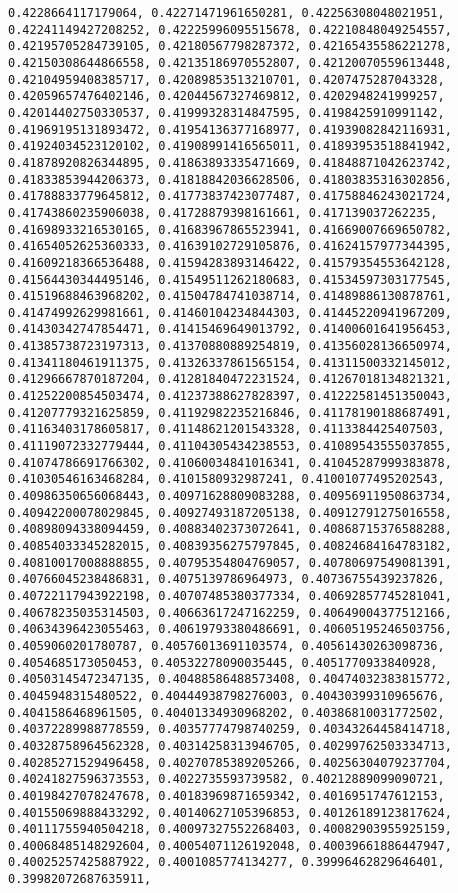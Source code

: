 \documentclass[11pt]{article}
\begin{document}
\begin{Verbatim}[commandchars=\\\{\}]
0.4228664117179064, 0.42271471961650281, 0.42256308048021951, 0.42241149427208252, 0.42225996095515678, 0.42210848049254557, 0.42195705284739105, 0.42180567798287372, 0.42165435586221278, 0.42150308644866558, 0.42135186970552807, 0.42120070559613448, 0.42104959408385717, 0.42089853513210701, 0.4207475287043328, 0.42059657476402146, 0.42044567327469812, 0.4202948241999257, 0.42014402750330537, 0.41999328314847595, 0.4198425910991142, 0.41969195131893472, 0.41954136377168977, 0.41939082842116931, 0.41924034523120102, 0.41908991416565011, 0.41893953518841942, 0.41878920826344895, 0.41863893335471669, 0.41848871042623742, 0.41833853944206373, 0.41818842036628506, 0.41803835316302856, 0.41788833779645812, 0.41773837423077487, 0.41758846243021724, 0.41743860235906038, 0.41728879398161661, 0.417139037262235, 0.41698933216530165, 0.41683967865523941, 0.41669007669650782, 0.41654052625360333, 0.41639102729105876, 0.41624157977344395, 0.41609218366536488, 0.41594283893146422, 0.41579354553642128, 0.41564430344495146, 0.41549511262180683, 0.41534597303177545, 0.41519688463968202, 0.41504784741038714, 0.41489886130878761, 0.41474992629981661, 0.41460104234844303, 0.41445220941967209, 0.41430342747854471, 0.41415469649013792, 0.41400601641956453, 0.41385738723197313, 0.41370880889254819, 0.41356028136650974, 0.41341180461911375, 0.41326337861565154, 0.41311500332145012, 0.41296667870187204, 0.41281840472231524, 0.41267018134821321, 0.41252200854503474, 0.41237388627828397, 0.41222581451350043, 0.41207779321625859, 0.41192982235216846, 0.41178190188687491, 0.41163403178605817, 0.41148621201543328, 0.4113384425407503, 0.41119072332779444, 0.41104305434238553, 0.41089543555037855, 0.41074786691766302, 0.41060034841016341, 0.41045287999383878, 0.41030546163468284, 0.4101580932987241, 0.41001077495202543, 0.40986350656068443, 0.40971628809083288, 0.40956911950863734, 0.40942200078029845, 0.40927493187205138, 0.40912791275016558, 0.40898094338094459, 0.40883402373072641, 0.40868715376588288, 0.40854033345282015, 0.40839356275797845, 0.40824684164783182, 0.40810017008888855, 0.40795354804769057, 0.40780697549081391, 0.40766045238486831, 0.4075139786964973, 0.40736755439237826, 0.40722117943922198, 0.40707485380377334, 0.40692857745281041, 0.40678235035314503, 0.40663617247162259, 0.40649004377512166, 0.40634396423055463, 0.40619793380486691, 0.40605195246503756, 0.4059060201780787, 0.40576013691103574, 0.40561430263098736, 0.4054685173050453, 0.40532278090035445, 0.4051770933840928, 0.40503145472347135, 0.40488586488573408, 0.40474032383815772, 0.4045948315480522, 0.40444938798276003, 0.40430399310965676, 0.4041586468961505, 0.40401334930968202, 0.40386810031772502, 0.40372289988778559, 0.40357774798740259, 0.40343264458414718, 0.40328758964562328, 0.40314258313946705, 0.40299762503334713, 0.40285271529496458, 0.40270785389205266, 0.40256304079237704, 0.40241827596373553, 0.4022735593739582, 0.40212889099090721, 0.40198427078247678, 0.40183969871659342, 0.4016951747612153, 0.40155069888433292, 0.40140627105396853, 0.40126189123817624, 0.40111755940504218, 0.40097327552268403, 0.40082903955925159, 0.40068485148292604, 0.40054071126192048, 0.40039661886447947, 0.40025257425887922, 0.4001085774134277, 0.39996462829646401, 0.39982072687635911, 
\end{Verbatim}
\end{document}
